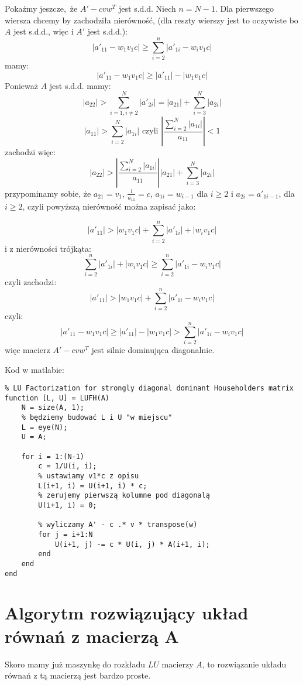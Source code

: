 \documentclass{article}
\begin{document}
Pokażmy jeszcze, że $A' - cvw^T$ jest s.d.d. \newline
Niech $n = N-1$. \newline
Dla pierwszego wiersza chcemy by zachodziła nierówność, (dla reszty wierszy jest to oczywiste bo $A$ jest s.d.d., więc i $A'$ jest s.d.d.):
$$ |a'_{11} - w_1v_1c| \ge \sum_{i=2}^n |a'_{1i} - w_iv_1c|$$
mamy:
$$ |a'_{11} - w_1v_1c| \ge |a'_{11}| - |w_1v_1c|$$
Ponieważ $A$ jest s.d.d. mamy:
$$|a_{22}| > \sum_{i = 1, i\neq2}^N|a'_{2i}| = |a_{21}| + \sum_{i=3}^N |a_{2i}| $$
$$ |a_{11}| > \sum_{i = 2}^N |a_{1i}| \mbox{ czyli } \left| \frac{\sum_{i = 2}^N |a_{1i}|}{a_{11}}\right| < 1 $$
zachodzi więc:
$$ |a_{22}| > \left| \frac{\sum_{i = 2}^N |a_{1i}|}{a_{11}}\right| |a_{21}| + \sum_{i=3}^N |a_{2i}| $$
przypominamy sobie, że $a_{21} = v_1$, $\frac{1}{a_{11}} = c$, $a_{1i} = w_{i-1}$ dla $i \ge 2$ i $a_{2i} = a'_{1 i-1}$, dla $i \ge 2$, czyli powyższą nierówność można zapisać jako:


$$|a'_{11}| > |w_1v_1c| + \sum_{i=2}^n |a'_{1i}| + |w_iv_1c|$$
i z nierówności trójkąta:
$$ \sum_{i=2}^n |a'_{1i}| + |w_iv_1c| \ge \sum_{i=2}^n |a'_{1i} - w_iv_1c| $$
czyli zachodzi:
$$ |a'_{11}| > |w_1v_1c| + \sum_{i=2}^n |a'_{1i} - w_iv_1c| $$
czyli: 
$$ |a'_{11} - w_1v_1c| \ge |a'_{11}| - |w_1v_1c| > \sum_{i=2}^n |a'_{1i} - w_iv_1c| $$
więc macierz $A' - cvw^T$ jest silnie dominująca diagonalnie.

\newpage

Kod w matlabie:

\begin{verbatim}
% LU Factorization for strongly diagonal dominant Householders matrix
function [L, U] = LUFH(A)
    N = size(A, 1);
    % będziemy budować L i U "w miejscu"
    L = eye(N);
    U = A;

    for i = 1:(N-1)
        c = 1/U(i, i);
        % ustawiamy v1*c z opisu
        L(i+1, i) = U(i+1, i) * c;
        % zerujemy pierwszą kolumne pod diagonalą
        U(i+1, i) = 0;

        % wyliczamy A' - c .* v * transpose(w)
        for j = i+1:N
            U(i+1, j) -= c * U(i, j) * A(i+1, i);
        end
    end
end
\end{verbatim}

\newpage

\section*{Algorytm rozwiązujący układ równań z macierzą A}

Skoro mamy już maszynkę do rozkładu $LU$ macierzy $A$, to rozwiązanie układu równań z tą macierzą jest bardzo proste.
\end{document}
